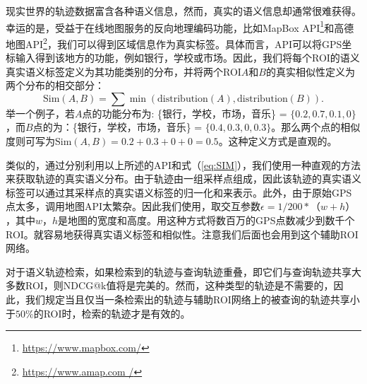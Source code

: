 现实世界的轨迹数据富含各种语义信息，然而，真实的语义信息却通常很难获得。幸运的是，受益于在线地图服务的反向地理编码功能，比如MapBox API\footnote{\url{https://www.mapbox.com/}}和高德地图API\footnote{\url{https://www.amap.com /}}，我们可以得到区域信息作为真实标签。具体而言，API可以将GPS坐标输入得到该地方的功能，例如银行，学校或市场。因此，我们将每个ROI的语义真实语义标签定义为其功能类别的分布，并将两个ROI$A$和$B$的真实相似性定义为两个分布的相交部分：
\begin{equation}
\mathrm{Sim}(A,B) = \sum{\min\left(\text{distribution}(A),{\text{distribution}(B)}\right)}.
\label{eq:SIM}
\end{equation}
举一个例子，若$A$点的功能分布为: \{银行，学校，市场，音乐\} = $\{0.2, 0.7, 0.1, 0\}$，而$B$点的为：\{银行，学校，市场，音乐\} = $\{0.4, 0.3, 0, 0.3\}$。那么两个点的相似度则可写为$\mathrm{Sim}(A,B) = 0.2 + 0.3 + 0 + 0 = 0.5$。这种定义方式是直观的。

类似的，通过分别利用以上所述的API和式（\ref{eq:SIM}），我们使用一种直观的方法来获取轨迹的真实语义分布。由于轨迹由一组采样点组成，因此该轨迹的真实语义标签可以通过其采样点的真实语义标签的归一化和来表示。此外，由于原始GPS点太多，调用地图API太繁杂。因此我们使用，取交互参数$\epsilon = 1/200 *（w + h）$，其中$ w，h $是地图的宽度和高度。用这种方式将数百万的GPS点数减少到数千个ROI。就容易地获得真实语义标签和相似性。注意我们后面也会用到这个辅助ROI网络。

对于语义轨迹检索，如果检索到的轨迹与查询轨迹重叠，即它们与查询轨迹共享大多数ROI，则NDCG@k值将是完美的。然而，这种类型的轨迹是不需要的，因此，我们规定当且仅当一条检索出的轨迹与辅助ROI网络上的被查询的轨迹共享小于$50\%$的ROI时，检索的轨迹才是有效的。


